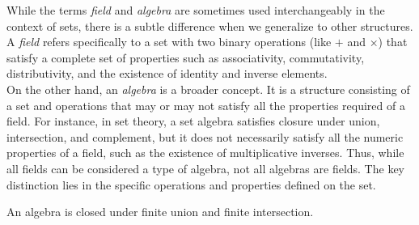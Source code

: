 While the terms \textit{field} and \textit{algebra} are sometimes used interchangeably in the context of sets, there is a subtle difference when we generalize to other structures. A \textit{field} refers specifically to a set with two binary operations (like $+$ and $\times$) that satisfy a complete set of properties such as associativity, commutativity, distributivity, and the existence of identity and inverse elements. \\

On the other hand, an \textit{algebra} is a broader concept. It is a structure consisting of a set and operations that may or may not satisfy all the properties required of a field. For instance, in set theory, a set algebra satisfies closure under union, intersection, and complement, but it does not necessarily satisfy all the numeric properties of a field, such as the existence of multiplicative inverses. Thus, while all fields can be considered a type of algebra, not all algebras are fields. The key distinction lies in the specific operations and properties defined on the set.\\

\begin{theorem}
    An algebra is closed under finite union and finite intersection.
\end{theorem}


